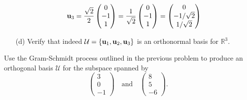\begin{problem}
\begin{enumerate}
{    \[ {\bf u}_3 = \frac{\sqrt{2}}{2} \begin{pmatrix} 0\\-1\\1 \end{pmatrix}  =
            \frac{1}{\sqrt{2}} \begin{pmatrix} 0\\-1\\1\end{pmatrix} = \begin{pmatrix}
                0\\-1/\sqrt{2} \\ 1/\sqrt{2} \end{pmatrix}\]
}
        \item[(d)] Verify that indeed $\mathcal{U} = \{{\bf u}_1, {\bf u}_2, {\bf u}_3\}$ is an
            orthonormal basis for $\mathbb{R}^3$.
    \end{enumerate}
\end{problem}


\begin{problem}
    Use the Gram-Schmidt process outlined in the previous problem to produce an orthogonal
    basis $\mathcal{U}$ for the subspace spanned by
    \[ \begin{pmatrix} 3\\0\\-1\end{pmatrix} \quad \text{and} \quad \begin{pmatrix}
            8\\5\\-6\end{pmatrix}. \]
\end{problem}

